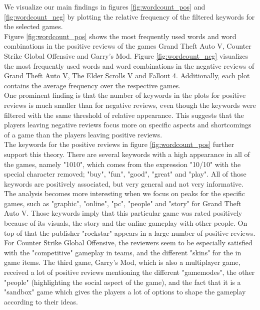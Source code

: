 \documentclass{article}
\theoremstyle{plain}
\theoremstyle{definition}
\theoremstyle{remark}
\begin{document}

We visualize our main findings in figures \ref{fig:wordcount_pos} and \ref{fig:wordcount_neg} by plotting the relative frequency of the filtered keywords for the selected games.\\
Figure \ref{fig:wordcount_pos} shows the most frequently used words and word combinations in the positive reviews of the games Grand Theft Auto V, Counter Strike Global Offensive and Garry's Mod. Figure \ref{fig:wordcount_neg} visualizes the most frequently used words and word combinations in the negative reviews of Grand Theft Auto V, The Elder Scrolls V and Fallout 4. Additionally, each plot contains the average frequency over the respective games.\\
One prominent finding is that the number of keywords in the plots for positive reviews is much smaller than for negative reviews, even though the keywords were filtered with the same threshold of relative appearance. This suggests that the players leaving negative reviews focus more on specific aspects and shortcomings of a game than the players leaving positive reviews.\\
The keywords for the positive reviews in figure \ref{fig:wordcount_pos} further support this theory. There are several keywords with a high appearance in all of the games, namely "1010", which comes from the expression "10/10" with the special character removed; "buy", "fun", "good", "great" and "play". All of those keywords are positively associated, but very general and not very informative.\\
The analysis becomes more interesting when we focus on peaks for the specific games, such as "graphic", "online", "pc", "people" and "story" for Grand Theft Auto V. Those keywords imply that this particular game was rated positively because of its visuals, the story and the online gameplay with other people. On top of that the publisher "rockstar" appears in a large number of positive reviews.\\
For Counter Strike Global Offensive, the reviewers seem to be especially satisfied with the "competitive" gameplay in teams, and the different "skins" for the in game items. The third game, Garry's Mod, which is also a multiplayer game, received a lot of positive reviews mentioning the different "gamemodes", the other "people" (highlighting the social aspect of the game),  and the fact that it is a "sandbox" game which gives the players a lot of options to shape the gameplay according to their ideas.\\
\end{document}
